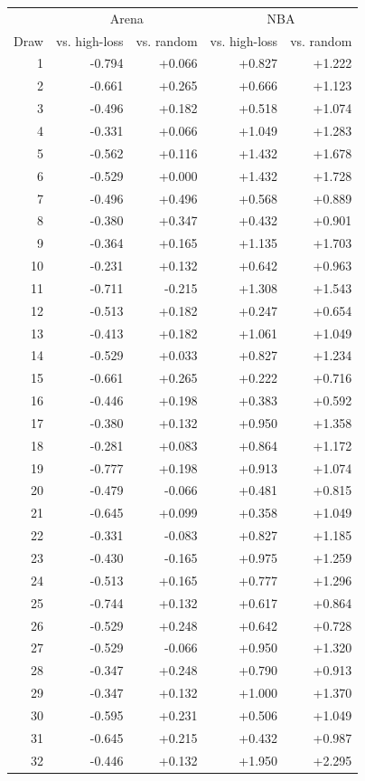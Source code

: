\begin{tabular}{rrrrr}
\toprule
 & \multicolumn{2}{c}{Arena} & \multicolumn{2}{c}{NBA} \\
Draw & vs. high-loss & vs. random & vs. high-loss & vs. random \\
\midrule
1 & -0.794 & +0.066 & +0.827 & +1.222 \\
2 & -0.661 & +0.265 & +0.666 & +1.123 \\
3 & -0.496 & +0.182 & +0.518 & +1.074 \\
4 & -0.331 & +0.066 & +1.049 & +1.283 \\
5 & -0.562 & +0.116 & +1.432 & +1.678 \\
6 & -0.529 & +0.000 & +1.432 & +1.728 \\
7 & -0.496 & +0.496 & +0.568 & +0.889 \\
8 & -0.380 & +0.347 & +0.432 & +0.901 \\
9 & -0.364 & +0.165 & +1.135 & +1.703 \\
10 & -0.231 & +0.132 & +0.642 & +0.963 \\
11 & -0.711 & -0.215 & +1.308 & +1.543 \\
12 & -0.513 & +0.182 & +0.247 & +0.654 \\
13 & -0.413 & +0.182 & +1.061 & +1.049 \\
14 & -0.529 & +0.033 & +0.827 & +1.234 \\
15 & -0.661 & +0.265 & +0.222 & +0.716 \\
16 & -0.446 & +0.198 & +0.383 & +0.592 \\
17 & -0.380 & +0.132 & +0.950 & +1.358 \\
18 & -0.281 & +0.083 & +0.864 & +1.172 \\
19 & -0.777 & +0.198 & +0.913 & +1.074 \\
20 & -0.479 & -0.066 & +0.481 & +0.815 \\
21 & -0.645 & +0.099 & +0.358 & +1.049 \\
22 & -0.331 & -0.083 & +0.827 & +1.185 \\
23 & -0.430 & -0.165 & +0.975 & +1.259 \\
24 & -0.513 & +0.165 & +0.777 & +1.296 \\
25 & -0.744 & +0.132 & +0.617 & +0.864 \\
26 & -0.529 & +0.248 & +0.642 & +0.728 \\
27 & -0.529 & -0.066 & +0.950 & +1.320 \\
28 & -0.347 & +0.248 & +0.790 & +0.913 \\
29 & -0.347 & +0.132 & +1.000 & +1.370 \\
30 & -0.595 & +0.231 & +0.506 & +1.049 \\
31 & -0.645 & +0.215 & +0.432 & +0.987 \\
32 & -0.446 & +0.132 & +1.950 & +2.295 \\
\bottomrule
\end{tabular}